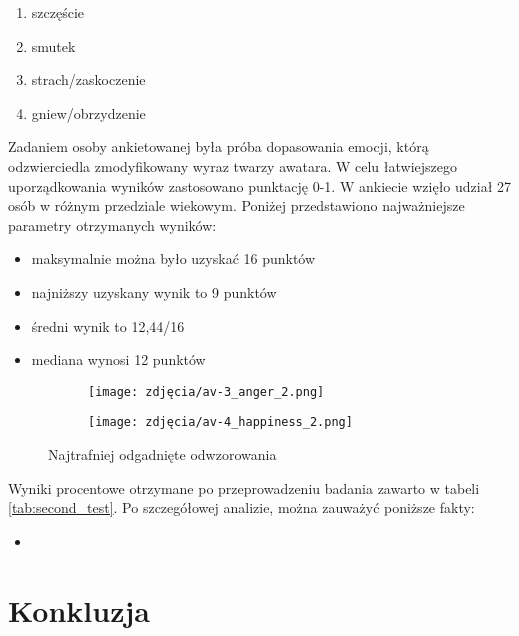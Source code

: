 \begin{enumerate}
    \item szczęście
    \item smutek
    \item strach/zaskoczenie
    \item gniew/obrzydzenie
\end{enumerate}



Zadaniem osoby ankietowanej była próba dopasowania emocji, którą odzwierciedla zmodyfikowany wyraz twarzy awatara. W celu łatwiejszego uporządkowania wyników zastosowano punktację 0-1. W ankiecie wzięło udział 27 osób w różnym przedziale wiekowym. Poniżej przedstawiono najważniejsze parametry otrzymanych wyników:
\begin{itemize}
    \item maksymalnie można było uzyskać 16 punktów
    \item najniższy uzyskany wynik to 9 punktów
    \item średni wynik to 12,44/16
    \item mediana wynosi 12 punktów
\end{itemize}

\begin{figure}[h]
	\centering
	\begin{subfigure}{0.35\textwidth}
		\centering
		\texttt{[image: zdjęcia/av-3\_anger\_2.png]}
		\subcaption{\label{av-3_anger_2}}
	\end{subfigure}
	\begin{subfigure}{0.35\textwidth}
		\centering
		\texttt{[image: zdjęcia/av-4\_happiness\_2.png]}
		\subcaption{\label{av-4_happiness_2}}
	\end{subfigure}
	
	\caption{\label{fig:best_results}Najtrafniej odgadnięte odwzorowania}
\end{figure}

Wyniki procentowe otrzymane po przeprowadzeniu badania zawarto w tabeli \ref{tab:second_test}. Po szczegółowej analizie, można zauważyć poniższe fakty:
\begin{itemize}
    \item 
\end{itemize}









\section{Konkluzja}
